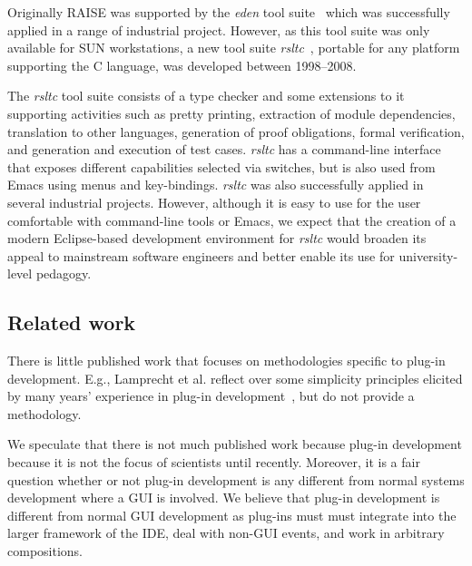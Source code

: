 \documentclass[conference]{IEEEtran}
\begin{document}
Originally RAISE was supported by the \emph{eden} tool
suite~\cite{edenReferenceManual} which was successfully applied in a
range of industrial project.  However, as this tool suite was only
available for SUN workstations, a new tool suite
\emph{rsltc}~\cite{rsltcUserGuide,RAISETools2003}, portable for any
platform supporting the C language, was developed between 1998--2008.

The \emph{rsltc} tool suite consists of a type checker and some
extensions to it supporting activities such as pretty printing,
extraction of module dependencies, translation to other languages,
generation of proof obligations, formal verification, and generation
and execution of test cases.  \emph{rsltc} has a command-line
interface that exposes different capabilities selected via switches,
but is also used from Emacs using menus and key-bindings.  \emph{rsltc}
was also successfully applied in several industrial projects.
However, although it is easy to use for the user comfortable with
command-line tools or Emacs, we expect that the creation of a modern
Eclipse-based development environment for \emph{rsltc} would broaden
its appeal to mainstream software engineers and better enable its use
for university-level pedagogy.

%
\subsection{Related work}
\label{sec:related-work}

There is little published work that focuses on methodologies specific
to plug-in development.  E.g., Lamprecht et al. reflect over some
simplicity principles elicited by many years' experience in plug-in
development~\cite{6229816}, but do not provide a methodology.

We speculate that there is not much published work because plug-in
development because it is not the focus of scientists until recently.
Moreover, it is a fair question whether or not plug-in development is
any different from normal systems development where a GUI is involved.
We believe that plug-in development is different from normal GUI
development as plug-ins must must integrate into the larger framework
of the IDE, deal with non-GUI events, and work in arbitrary
compositions.

\end{document}
